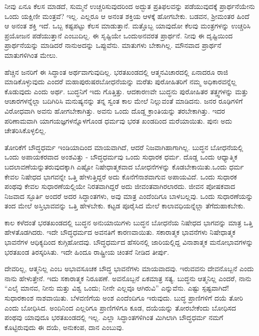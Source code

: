ನೀವು ಏನೂ ಕೆಲಸ ಮಾಡದೆ, ಸುಮ್ಮನೆ ಉಚ್ಚರಿಸುವುದರಿಂದ ಅದ್ಭುತ ಪ್ರತಿಫಲವನ್ನು ಪಡೆಯುವುದಕ್ಕೆ ಪ್ರಾರ್ಥನೆಯೇನು ಒಂದು ಯಕ್ಷಿಣೀ ಮಂತ್ರವೆ? ಇಲ್ಲ. ಎಲ್ಲರೂ ಆ ಅನಂತ ಶಕ್ತಿಯ ಆಳಕ್ಕೆ ಹೋಗಬೇಕು. ಬಡವನ, ಶ‍್ರೀಮಂತರ ಹಿಂದೆ ಆ ಅನಂತ ಶಕ್ತಿ ಇದೆ. ಒಬ್ಬ ಕಷ್ಟಪಟ್ಟು ಕೆಲಸ ಮಾಡುತ್ತಾನೆ. ಮತ್ತೊಬ್ಬ ಯಾವುದೋ ಕೆಲವು ಮಂತ್ರಗಳನ್ನು ಉಚ್ಚರಿಸಿ ಪ್ರಯೋಜನ ಪಡೆಯುತ್ತಾನೆ ಎಂಬುದಿಲ್ಲ. ಈ ಸೃಷ್ಟಿಯೇ ಒಂದು\break ಅನವರತ ಪ್ರಾರ್ಥನೆ. ನೀವು ಈ ದೃಷ್ಟಿಯಿಂದ ಪ್ರಾರ್ಥನೆಯನ್ನು ಮಾಡಿದರೆ ನಾನು\break ಅದನ್ನು ಒಪ್ಪುವೆನು. ಮಾತುಗಳು ಬೇಕಾಗಿಲ್ಲ. ಮೌನವಾದ ಪ್ರಾರ್ಥನೆ ಮಾತುಗಳಿಗಿಂತ ಮೇಲು.

ಹೆಚ್ಚಿನ ಜನರಿಗೆ ಈ ಸಿದ್ಧಾಂತ ಅರ್ಥವಾಗುವುದಿಲ್ಲ. ಭರತಖಂಡದಲ್ಲಿ ಆತ್ಮನ\break ವಿಚಾರದಲ್ಲಿ ಏನಾದರೂ ರಾಜಿ ಮಾಡಿಕೊಳ್ಳುವುದು ಎಂದರೆ ಮಹಾಪುರುಷರ\break ಬೋಧನೆಯನ್ನು ಮರೆತು ಪುರೋಹಿತರಿಗೆ ನಮ್ಮ ಅಧಿಕಾರವನ್ನೆಲ್ಲ ಕೊಡುವುದು ಎಂದು ಅರ್ಥ. ಬುದ್ಧನಿಗೆ ಇದು ಗೊತ್ತಿತ್ತು. ಆದಕಾರಣವೇ ಬುದ್ಧನು ಪುರೋಹಿತರ ತತ್ತ್ವಗಳನ್ನು ಮತ್ತು ಆಚಾರಗಳನ್ನೆಲ್ಲಾ ಬದಿಗಿರಿಸಿ ಮನುಷ್ಯನನ್ನು ತನ್ನ ಸ್ವಂತ ಕಾಲ ಮೇಲೆ ನಿಲ್ಲುವಂತೆ ಮಾಡಿದನು. ಜನರ ರೂಢಿಗಳಿಗೆ ವಿರೋಧವಾಗಿ ಅವನು ಹೋಗಬೇಕಾಗಿತ್ತು. ಅವನು ಒಂದು ದೊಡ್ಡ ಕ್ರಾಂತಿಯನ್ನು ತರಬೇಕಾಗಿತ್ತು. ಇದರ ಪರಿಣಾಮವಾಗಿ ಯಾಗ\break ಯಜ್ಞಗಳನ್ನೊಳಗೊಂಡ ಧರ್ಮವು ಭರತ ಖಂಡದಿಂದ ಮರೆಯಾಯಿತು. ಪುನಃ ಅದು ಚೇತರಿಸಿಕೊಳ್ಳಲಿಲ್ಲ.

ತೋರಿಕೆಗೆ ಬೌದ್ಧಧರ್ಮ ಇಂಡಿಯಾದಿಂದ ಮಾಯವಾಗಿದೆ, ಆದರೆ ನಿಜವಾಗಿ\break ಹಾಗಾಗಿಲ್ಲ. ಬುದ್ಧನ ಬೋಧನೆಯಲ್ಲಿ ಒಂದು ಅಪಾಯಕರವಾದ ಅಂಶವಿತ್ತು - ಬೌದ್ಧಧರ್ಮವು ಒಂದು ಸುಧಾರಕ ಧರ್ಮ. ದೊಡ್ಡ ಒಂದು ಆಧ್ಯಾತ್ಮಿಕ ಬದಲಾವಣೆಯನ್ನು\break ತರುವುದಕ್ಕಾಗಿ ಎಷ್ಟೋ ನಿಷೇಧಾತ್ಮಕವಾದ ಬೋಧನೆಗಳನ್ನು ಕೊಡಬೇಕಾಯಿತು.\break ಒಂದು ಧರ್ಮ ಕೇವಲ ನಿಷೇಧದ ಭಾಗವನ್ನೇ ಒತ್ತಿ ಹೇಳುತ್ತಿದ್ದರೆ ಅದು ಕೊನೆಗೆ\break ನಾಶವಾಗುವ ಅಪಾಯವಿದೆ. ಒಂದು ಸುಧಾರಕ ಪಂಥವು ಕೇವಲ ಸುಧಾರಣೆಯಲ್ಲಿಯೇ ನಿರತವಾಗಿದ್ದರೆ ಅದು ಜೀವಂತವಾಗಿರಲಾರದು. ಜೀವನ ಪೋಷಕವಾದ ನಿಜವಾದ ಸ್ಫೂರ್ತಿ ಅಂದರೆ ಅದರ ಸಿದ್ಧಾಂತಗಳು, ಅವು ಮಾತ್ರ ಎಂದೆಂದಿಗೂ ಬಾಳಬಲ್ಲವು. ಒಂದು ಸುಧಾರಣೆಯನ್ನು ತಂದ ಮೇಲೆ ಅಸ್ತಿಭಾವವನ್ನು ಒತ್ತಿ ಹೇಳಬೇಕು. ಕಟ್ಟಡ ಪೂರೈಸಿದ ಮೇಲೆ ಕಾಲಾವಧಿಯನ್ನೆಲ್ಲಾ ತೆಗೆದುಹಾಕಬೇಕು.

ಕಾಲ ಕಳೆದಂತೆ ಭರತಖಂಡದಲ್ಲಿ ಬುದ್ಧನ ಅನುಯಾಯಿಗಳು ಬುದ್ಧನ ಬೋಧನೆಯ ನಿಷೇಧದ ಭಾಗವನ್ನು ಮಾತ್ರ ಒತ್ತಿ ಹೇಳತೊಡಗಿದರು. ಇದೇ ಬೌದ್ಧಧರ್ಮದ ಅವನತಿಗೆ ಕಾರಣವಾಯಿತು. ಸಕಾರಾತ್ಮಕ ಭಾವನೆಗಳು ನಿಷೇಧಾತ್ಮಕ ಭಾವನೆಗಳ ಆಧಿಕ್ಯದಿಂದ ಕುಗ್ಗಿಹೋದವು. ಬೌದ್ಧಧರ್ಮದ ಹೆಸರಿನಲ್ಲಿ ಜಾರಿಯಲ್ಲಿದ್ದ ವಿನಾಶಾತ್ಮಕ ಮನೋಭಾವಗಳನ್ನು ಭರತಖಂಡ ತಿರಸ್ಕರಿಸಿತು. ಇದೇ ಹಿಂದೂ ರಾಷ್ಟ್ರೀಯ ಚಿಂತನೆ ನೀಡಿದ ತೀರ್ಪು.

ದೇವರಿಲ್ಲ, ಆತ್ಮನಿಲ್ಲ ಎಂಬ ಅಭಾವಸೂಚಕ ಬೌದ್ಧ ಭಾವನೆಗಳು ಮಾಯವಾದವು. ಇರುವವನು ದೇವನೊಬ್ಬನೆ ಎಂದು ನಾನು ಹೇಳುತ್ತೇನೆ. ಇದು ಸಕಾರಾತ್ಮಕ ನಿರೂಪಣೆ. ಅವನೊಬ್ಬನೆ ಏಕಮಾತ್ರ ಸತ್ಯ. ಬುದ್ಧನು ಆತ್ಮನಿಲ್ಲ ಎಂದರೆ, ನಾನು “ಎಲೈ ಮಾನವ, ನೀನು ಮತ್ತು ವಿಶ್ವ ಒಂದು; ನೀನೇ ಎಲ್ಲವೂ ಆಗಿರುವಿ” ಎನ್ನುವೆನು. ಎಷ್ಟು ಸ್ಪಷ್ಟವಾಗಿದೆ! ಸುಧಾರಕಾಂಶ ನಾಶವಾಯಿತು. ಬೆಳವಣಿಗೆಯ ಅಂಶ ಎಂದೆಂದಿಗೂ ಇರುವುದು. ಬುದ್ಧ ಪ್ರಾಣಿಗಳಿಗೆ ದಯೆ ತೋರಿ ಎಂದು ಬೋಧಿಸಿದ. ಅಂದಿನಿಂದ ಎಲ್ಲರಿಗೂ ಪ್ರಾಣಿಗಳಿಗೂ ಕೂಡ, ದಯೆಯನ್ನು ತೋರಬೇಕೆಂದು ಬೋಧಿಸದ ಪಂಥವು ಯಾವುದೂ ಭರತಖಂಡದಲ್ಲಿ ಇಲ್ಲ. ಎಲ್ಲಾ ಸಿದ್ಧಾಂತಗಳಿಗಿಂತ ಮಿಗಿಲಾಗಿ ಬೌದ್ಧಧರ್ಮ ನಮಗೆ ಕೊಟ್ಟಿರುವುದು ಈ ದಯೆ, ಅನುಕಂಪ, ದಾನ ಎಂಬುವು.

